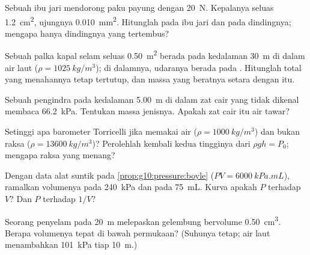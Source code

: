 \begin{exercise}[$\star\star$]\label{exo:g10:pressure:6}
Sebuah ibu jari mendorong paku payung dengan \qty{20}{N}. Kepalanya
seluas \qty{1.2}{cm^2}, ujungnya \qty{0.010}{mm^2}. Hitunglah 
pada ibu jari dan pada dindingnya; mengapa hanya dindingnya yang
tertembus?
\end{exercise}

\begin{exercise}[$\star\star$]\label{exo:g10:pressure:7}
Sebuah palka kapal selam seluas \qty{0.50}{m^2} berada pada kedalaman
\qty{30}{m} di dalam air laut ($\rho = \qty{1025}{kg/m^3}$); di
dalamnya, udaranya berada pada . Hitunglah  total
yang menahannya tetap tertutup, dan massa yang beratnya setara dengan
 itu.
\end{exercise}

\begin{exercise}[$\star\star$]\label{exo:g10:pressure:8}
Sebuah pengindra pada kedalaman \qty{5.00}{m} di dalam zat cair yang
tidak dikenal membaca  \qty{66.2}{kPa}. Tentukan massa
jenisnya. Apakah zat cair itu air tawar?
\end{exercise}

\begin{exercise}[$\star\star$]\label{exo:g10:pressure:9}
Setinggi apa barometer Torricelli jika memakai air
($\rho = \qty{1000}{kg/m^3}$) dan bukan raksa
($\rho = \qty{13600}{kg/m^3}$)? Perolehlah kembali kedua tingginya dari
$\rho g h = P_0$; mengapa raksa yang menang?
\end{exercise}

\begin{exercise}[$\star\star$]\label{exo:g10:pressure:10}
Dengan data alat suntik pada \cref{prop:g10:pressure:boyle}
($PV = \qty{6000}{kPa.mL}$), ramalkan volumenya pada \qty{240}{kPa} dan
 pada \qty{75}{mL}. Kurva apakah $P$ terhadap $V$? Dan $P$
terhadap $1/V$?
\end{exercise}

\begin{exercise}[$\star\star$]\label{exo:g10:pressure:11}
Seorang penyelam pada \qty{20}{m} melepaskan gelembung bervolume
\qty{0.50}{cm^3}. Berapa volumenya tepat di bawah permukaan? (Suhunya
tetap; air laut menambahkan \qty{101}{kPa} tiap \qty{10}{m}.)
\end{exercise}

